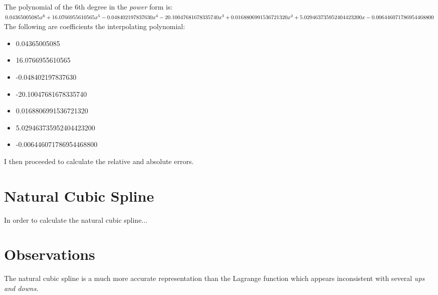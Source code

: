 \documentclass{article}
\begin{document}
The polynomial of the 6th degree in the {\it power} form is: \\

$0.04365005085x^6 + 16.0766955610565x^5 - 0.048402197837630x^4 - 20.10047681678335740x^3\\ + 0.0168806991536721320x^2 + 5.029463735952404423200x - 0.006446071786954468800$ \\

The following are coefficients the interpolating polynomial:
 \begin{itemize}
  \item 0.04365005085
  \item 16.0766955610565
  \item -0.048402197837630
  \item -20.10047681678335740
  \item 0.0168806991536721320
  \item 5.029463735952404423200
  \item -0.006446071786954468800
  \end{itemize}

I then proceeded to calculate the relative and absolute errors.

\section{Natural Cubic Spline}
In order to calculate the natural cubic spline...

\section{Observations}
The natural cubic spline is a much more accurate representation than the Lagrange function which appears inconsistent with several {\it ups and downs}.  
\end{document}
